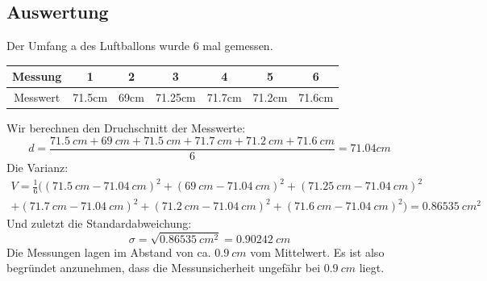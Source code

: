 \documentclass{article}
\begin{document}
        \subsection{Auswertung}
            Der Umfang a des Luftballons wurde 6 mal gemessen.
            \begin{center}
                \begin{tabular}{c c c c c c c}
                    Messung & 1 & 2 & 3 & 4 & 5 & 6 \\
                    \midrule
                    Messwert & 71.5cm & 69cm & 71.25cm & 71.7cm & 71.2cm & 71.6cm \\
                    
                \end{tabular}    
            \end{center}
        Wir berechnen den Druchschnitt der Messwerte:
        \[ d = \frac{ \SI{71.5}{cm} + \SI{69}{cm} + \SI{71.5}{cm} + \SI{71.7}{cm} + \SI{71.2}{cm} + \SI{71.6}{cm} }{ 6 }  = 71.04cm\]
        Die Varianz:
        \begin{gather*}
            V = \frac{1}{6} ( {( \SI{71.5}{cm} - \SI{71.04}{cm} )}^2 + {( \SI{69}{cm} - \SI{71.04}{cm} )}^2 + {( \SI{71.25}{cm} - \SI{71.04}{cm} )}^2 \\
               + {( \SI{71.7}{cm} - \SI{71.04}{cm} )}^2 + {( \SI{71.2}{cm} - \SI{71.04}{cm} )}^2 + {( \SI{71.6}{cm} - \SI{71.04}{cm} )}^2 )
             = \SI{0.86535}{{cm}^2}
        \end{gather*} 
        Und zuletzt die Standardabweichung:
        \[ \sigma = \sqrt{\SI{0.86535}{{cm}^2}}  = \SI{0.90242}{cm} \]
        Die Messungen lagen im Abstand von ca. \(\SI{0.9}{cm}\) vom Mittelwert.
        Es ist also begründet anzunehmen, dass die Messunsicherheit ungefähr bei \(\SI{0.9}{cm}\) liegt.\cite{Standardabweichung}
    
    \section*{} %
    \printbibliography[title={Quellen}]
\end{document}
